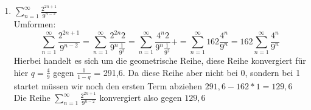 \documentclass{article}
\begin{document}
\begin{enumerate}[ label= (\roman*) ]
        \item \( \sum_{n=1}^{\infty} \frac{ 2^{2n+1} }{ 9^{n-2}} \) \\
        Umformen:
        \[
            \sum_{n=1}^{\infty} \frac{ 2^{2n+1} }{ 9^{n-2}}
            = \sum_{n=1}^{\infty} \frac{ 2^{2n} 2 }{ 9^{n} \frac{1}{9^2}}
            = \sum_{n=1}^{\infty} \frac{ 4^{n} 2 }{ 9^{n} \frac{1}{9^2}}+
            = \sum_{n=1}^{\infty} 162 \frac{ 4^{n} }{ 9^{n} }
            = 162 \sum_{n=1}^{\infty} \frac{ 4^{n} }{ 9^{n} }
         \]
         Hierbei handelt es sich um die geometrische Reihe, diese Reihe konvergiert für hier \(q = \frac{4}{9}\) gegen \(\frac{1}{1-q}\) = 291,6.
         Da diese Reihe aber nicht bei 0, sondern bei 1 startet müssen wir noch den ersten Term abziehen \(291,6 - 162*1 = 129,6\)
         Die Reihe \( \sum_{n=1}^{\infty} \frac{ 2^{2n+1} }{ 9^{n-2}} \) konvergiert also gegen \(129,6\)
    \end{enumerate}
\end{document}
